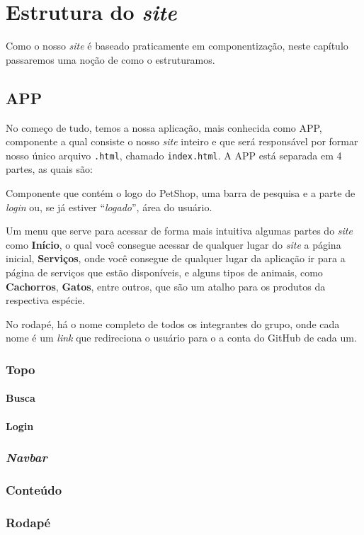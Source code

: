 \chapter{Estrutura do \emph{site}}
Como o nosso \emph{site} é baseado praticamente em componentização, neste
capítulo passaremos uma noção de como o estruturamos.

\section{APP}
No começo de tudo, temos a nossa aplicação, mais conhecida como APP, componente
a qual consiste o nosso \emph{site} inteiro e que será responsável por formar
nosso único arquivo \texttt{.html}, chamado \texttt{index.html}. A APP está
separada em 4 partes, as quais são:
	\begin{description}[style=nextline]
		\item[Topo] Componente que contém o logo do PetShop, uma barra de
pesquisa e a parte de \emph{login} ou, se já estiver “\emph{logado}”, área do
usuário.
		\item[\emph{Navbar}] Um menu que serve para acessar de forma mais
intuitiva algumas partes do \emph{site} como \textbf{Início}, o qual você
consegue acessar de qualquer lugar do \emph{site} a página inicial,
\textbf{Serviços}, onde você consegue de qualquer lugar da aplicação ir para a
página de serviços que estão disponíveis, e alguns tipos de animais, como
\textbf{Cachorros}, \textbf{Gatos}, entre outros, que são um atalho para os
produtos da respectiva espécie.
		\item[Conteúdo]
		\item[Rodapé] No rodapé, há o nome completo de todos os integrantes do
grupo, onde cada nome é um \emph{link} que redireciona o usuário para o a conta
do GitHub de cada um.
	\end{description}

\subsection{Topo}
\subsubsection{Busca}
\subsubsection{Login}
\subsection{\emph{Navbar}}
\subsection{Conteúdo}
\subsection{Rodapé}
